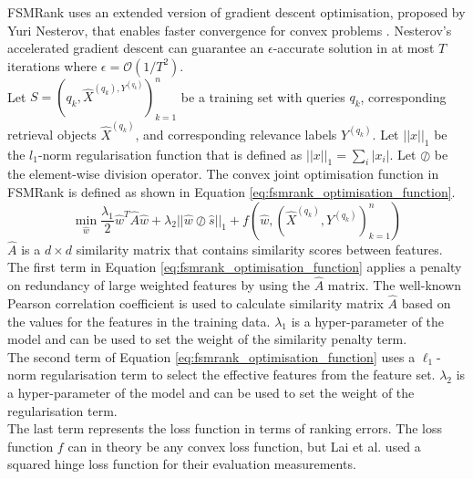 FSMRank uses an extended version of gradient descent optimisation, proposed by Yuri Nesterov, that enables faster convergence for convex problems \cite{Nesterov2004}. Nesterov's accelerated gradient descent can guarantee an $\epsilon$-accurate solution in at most $T$ iterations where $\epsilon=\mathcal{O}(1/T^2)$.\\

Let $S = {(q_k, \hat{X}^{(q_k), Y^{(q_k)}})}_{k=1}^n$ be a training set with queries $q_k$, corresponding retrieval objects $\hat{X}^{(q_k)}$, and corresponding relevance labels $Y^{(q_k)}$. Let $||x||_1$ be the $l_1$-norm regularisation function that is defined as $||x||_1 = \sum\nolimits_i |x_i|$. Let $\oslash$ be the element-wise division operator. The convex joint optimisation function in FSMRank is defined as shown in Equation \ref{eq:fsmrank_optimisation_function}.
\begin{equation}
\min_{\hat{w}} \frac{\lambda_1}{2} \hat{w}^T \hat{A}\hat{w} + \lambda_2 ||\hat{w}\oslash\hat{s}||_1 + f(\hat{w}, (\hat{X}^{(q_k)}, Y^{(q_k)})_{k=1}^n)
\label{eq:fsmrank_optimisation_function}
\end{equation}
\noindent $\hat{A}$ is a $d \times d$ similarity matrix that contains similarity scores between features. The first term in Equation \ref{eq:fsmrank_optimisation_function} applies a penalty on redundancy of large weighted features by using the $\hat{A}$ matrix. The well-known Pearson correlation coefficient is used to calculate similarity matrix $\hat{A}$ based on the values for the features in the training data. $\lambda_1$ is a hyper-parameter of the model and can be used to set the weight of the similarity penalty term.\\

The second term of Equation \ref{eq:fsmrank_optimisation_function} uses a $\ell_1$-norm regularisation term to select the effective features from the feature set. $\lambda_2$ is a hyper-parameter of the model and can be used to set the weight of the regularisation term.\\

The last term represents the loss function in terms of ranking errors. The loss function $f$ can in theory be any convex loss function, but Lai et al. \cite{Lai2013c} used a squared hinge loss function for their evaluation measurements. 

